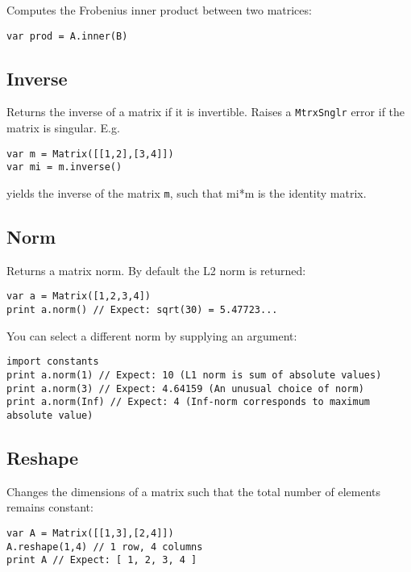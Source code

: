 Computes the Frobenius inner product between two matrices:

\begin{lstlisting}
var prod = A.inner(B)
\end{lstlisting}

\hypertarget{inverse}{%
\subsection{Inverse}\label{inverse}}

Returns the inverse of a matrix if it is invertible. Raises a
\texttt{MtrxSnglr} error if the matrix is singular. E.g.

\begin{lstlisting}
var m = Matrix([[1,2],[3,4]])
var mi = m.inverse()
\end{lstlisting}

yields the inverse of the matrix \texttt{m}, such that mi*m is the
identity matrix.

\hypertarget{norm}{%
\subsection{Norm}\label{norm}}

Returns a matrix norm. By default the L2 norm is returned:

\begin{lstlisting}
var a = Matrix([1,2,3,4])
print a.norm() // Expect: sqrt(30) = 5.47723...
\end{lstlisting}

You can select a different norm by supplying an argument:

\begin{lstlisting}
import constants
print a.norm(1) // Expect: 10 (L1 norm is sum of absolute values) 
print a.norm(3) // Expect: 4.64159 (An unusual choice of norm)
print a.norm(Inf) // Expect: 4 (Inf-norm corresponds to maximum absolute value)
\end{lstlisting}

\hypertarget{reshape}{%
\subsection{Reshape}\label{reshape}}

Changes the dimensions of a matrix such that the total number of
elements remains constant:

\begin{lstlisting}
var A = Matrix([[1,3],[2,4]])
A.reshape(1,4) // 1 row, 4 columns
print A // Expect: [ 1, 2, 3, 4 ]
\end{lstlisting}

